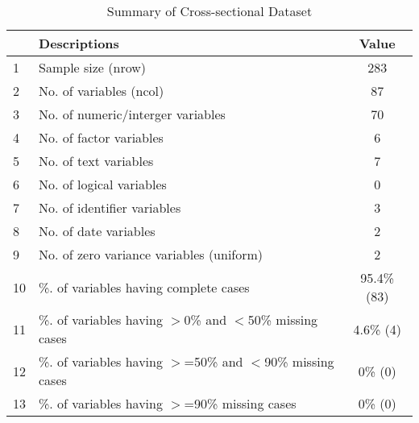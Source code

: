 \begin{table}[ht]
\centering
\caption{Summary of Cross-sectional Dataset} 
\begin{tabular}{llc}
  \hline
 & Descriptions & Value \\ 
  \hline
1 & Sample size (nrow) & 283 \\ 
  2 & No. of variables (ncol) & 87 \\ 
  3 & No. of numeric/interger variables & 70 \\ 
  4 & No. of factor variables & 6 \\ 
  5 & No. of text variables & 7 \\ 
  6 & No. of logical variables & 0 \\ 
  7 & No. of identifier variables & 3 \\ 
  8 & No. of date variables & 2 \\ 
  9 & No. of zero variance variables (uniform) & 2 \\ 
  10 & \%. of variables having complete cases & 95.4\% (83) \\ 
  11 & \%. of variables having $>$0\% and $<$50\% missing cases & 4.6\% (4) \\ 
  12 & \%. of variables having $>$=50\% and $<$90\% missing cases & 0\% (0) \\ 
  13 & \%. of variables having $>$=90\% missing cases & 0\% (0) \\ 
   \hline
\end{tabular}
\end{table}
